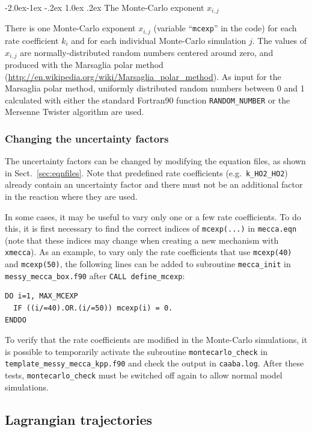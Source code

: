 \documentclass[twoside]{article}
\makeatletter
\renewcommand\paragraph{\@startsection{paragraph}{4}{\z@}%
  {-2.0ex\@plus -1ex \@minus -.2ex}%
  {1.0ex \@plus .2ex}%
  {\normalfont\normalsize\bfseries}}
\makeatother
\begin{document}
\paragraph{The Monte-Carlo exponent $x_{i,j}$} 

There is one Monte-Carlo exponent $x_{i,j}$ (variable ``\verb|mcexp|''
in the code) for each rate coefficient $k_i$ and for each individual
Monte-Carlo simulation $j$. The values of $x_{i,j}$ are
normally-distributed random numbers centered around zero, and produced
with the Marsaglia polar method
(\url{http://en.wikipedia.org/wiki/Marsaglia_polar_method}). As input
for the Marsaglia polar method, uniformly distributed random numbers
between 0 and 1 calculated with either the standard Fortran90 function
{\tt RANDOM\_NUMBER} or the Mersenne Twister algorithm \citep{2404} are
used.

\subsubsection{Changing the uncertainty factors}

The uncertainty factors can be changed by modifying the equation files,
as shown in Sect.~\ref{sec:eqnfiles}. Note that predefined rate
coefficients (e.g.\ \verb|k_HO2_HO2|) already contain an uncertainty
factor and there must not be an additional factor in the reaction where
they are used.

In some cases, it may be useful to vary only one or a few rate
coefficients. To do this, it is first necessary to find the correct
indices of \verb|mcexp(...)| in \verb|mecca.eqn| (note that these
indices may change when creating a new mechanism with \verb|xmecca|). As
an example, to vary only the rate coefficients that use \verb|mcexp(40)|
and \verb|mcexp(50)|, the following lines can be added to subroutine
\verb|mecca_init| in \verb|messy_mecca_box.f90| after
\verb|CALL define_mcexp|:
\begin{verbatim}
DO i=1, MAX_MCEXP
  IF ((i/=40).OR.(i/=50)) mcexp(i) = 0.
ENDDO
\end{verbatim}

To verify that the rate coefficients are modified in the Monte-Carlo
simulations, it is possible to temporarily activate the subroutine
\verb|montecarlo_check| in \verb|template_messy_mecca_kpp.f90| and check
the output in \verb|caaba.log|. After these tests,
\verb|montecarlo_check| must be switched off again to allow normal model
simulations.

\subsection{Lagrangian trajectories}
\label{sec:lagrangian}
\end{document}
